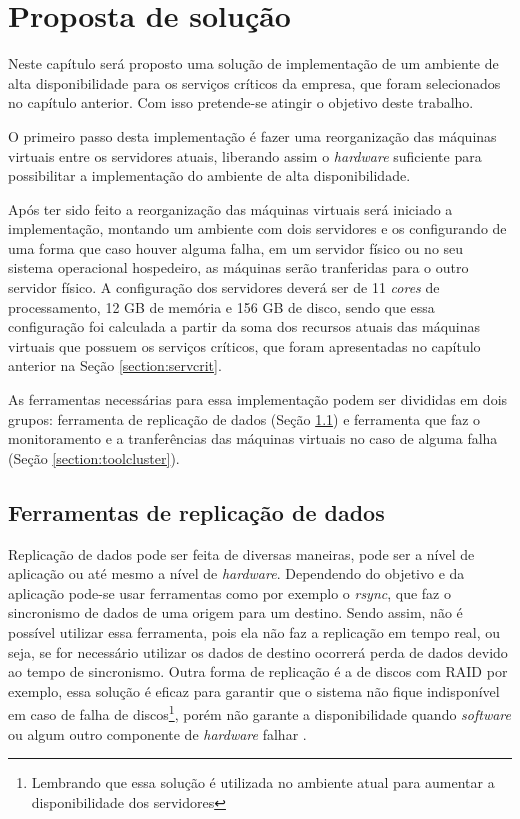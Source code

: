 \chapter{Proposta de solução}
\label{cap:propostadesolucao}

Neste capítulo será proposto uma solução de implementação de um ambiente de alta disponibilidade para os serviços críticos da empresa, que 
foram selecionados no capítulo anterior. Com isso pretende-se atingir o objetivo deste trabalho.

O primeiro passo desta implementação é fazer uma reorganização das máquinas virtuais entre os servidores atuais, liberando assim o 
\textit{hardware} suficiente para possibilitar a implementação do ambiente de alta disponibilidade. 

Após ter sido feito a reorganização das máquinas virtuais será iniciado a implementação, montando um ambiente com dois servidores e os 
configurando de uma forma que caso houver alguma falha, em um servidor físico ou no seu sistema operacional hospedeiro, as máquinas serão 
tranferidas para o outro servidor físico. 
A configuração dos servidores deverá ser de 11 \textit{cores} de processamento, 12 GB de memória e 156 GB de disco, sendo que essa configuração 
foi calculada a partir da soma dos recursos atuais das máquinas virtuais que possuem os serviços críticos, que foram apresentadas no capítulo
anterior na Seção \ref{section:servcrit}.

As ferramentas necessárias para essa implementação podem ser divididas em dois grupos: ferramenta de replicação de dados 
(Seção \ref{section:toolrepl}) e ferramenta que faz o monitoramento e a tranferências das máquinas virtuais no caso de alguma falha 
(Seção \ref{section:toolcluster}).

\section{Ferramentas de replicação de dados}
\label{section:toolrepl}

Replicação de dados pode ser feita de diversas maneiras, pode ser a nível de aplicação ou até mesmo a nível de \textit{hardware}.
Dependendo do objetivo e da aplicação pode-se usar ferramentas como por exemplo o \textit{rsync}, que faz o sincronismo de dados de uma origem
para um destino. Sendo assim, não é possível utilizar essa ferramenta, pois ela não faz a replicação em tempo real, ou seja, se for necessário
utilizar os dados de destino ocorrerá perda de dados devido ao tempo de sincronismo. Outra forma de replicação é a de discos com \ac{RAID} 
por exemplo, essa solução é eficaz para garantir que o sistema não fique indisponível em caso de falha de discos\footnote{Lembrando que essa 
solução é utilizada no ambiente atual para aumentar a disponibilidade dos servidores}, porém não garante a disponibilidade quando \textit{software}
ou algum outro componente de \textit{hardware} falhar \cite{zaminhani2008}.

